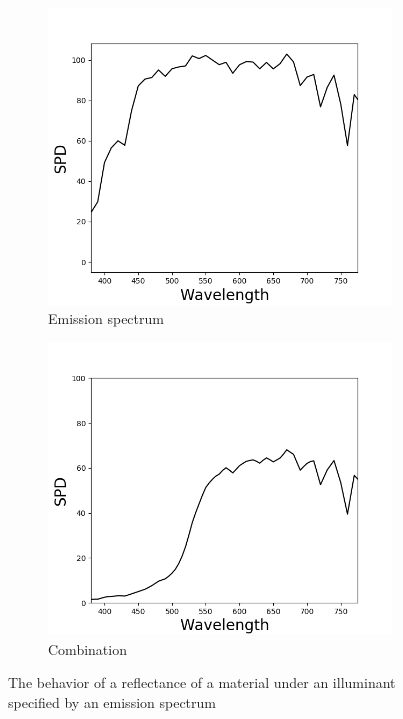 \begin{figure}[t]
\begin{subfigure}[t]{0.31\textwidth}
	\includegraphics[width=\linewidth]{img/spectralRepres_emission.png}
	\caption{Emission spectrum}
	\label{fig:spectralRepres_illuminant}
	\end{subfigure}
	\begin{subfigure}[t]{0.31\textwidth}
	\captionsetup{justification=centering}
	\includegraphics[width=\linewidth]{img/spectralRepres_combination.png}
	\caption{Combination}
	\label{fig:spectralRepres_combination}
	\end{subfigure}
	\caption{The behavior of a reflectance of a material under an illuminant specified by an emission spectrum}
	\label{fig:spectralRepresExamples}
\end{figure}

